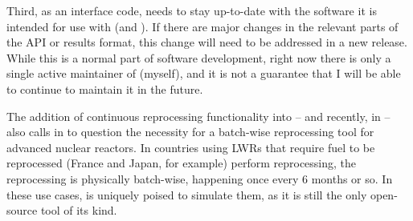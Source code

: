 Third, as an interface code, \SaltProc needs to stay up-to-date with the
software it is intended for use with (\OpenMC and \SerpentTWO). If there are
major changes in the relevant parts of the API or results format, this change
will need to be addressed in a new \SaltProc release. While this is a normal
part of software development, right now there is only a single active
maintainer of \SaltProc (myself), and it is not a guarantee that I will
be able to continue to maintain it in the future.

The addition of continuous reprocessing functionality into \SerpentTWO -- and
recently, in  \OpenMC -- also calls in to question the necessity for a
batch-wise reprocessing tool for advanced nuclear reactors. In countries using
LWRs that require fuel to be reprocessed (France and Japan, for example) perform
reprocessing, the reprocessing is physically batch-wise, happening once every 6
months or so. In these use cases, \SaltProc is uniquely poised to simulate them,
as it is still the only open-source tool of its kind.
